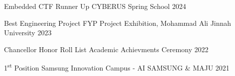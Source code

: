 \begin{cvhonors} 


  \cvhonor
    {Embedded CTF Runner Up} %
    {CYBERUS Spring School} %
    {\hspace{-2em}} %
    {2024} %
    
    
  \cvhonor
    {Best Engineering Project} %
    {FYP Project Exhibition, Mohammad Ali Jinnah University} %
    {\hspace{-2em}} %
    {2023} %

  \cvhonor
    {Chancellor Honor Roll List} %
    {Academic Achievments Ceremony} %
    {\hspace{-2em}} %
    {2022} %

  \cvhonor
    {1\textsuperscript{st} Position Samsung Innovation Campus - AI} %
    {SAMSUNG \& MAJU} %
    {\hspace{-2em} } %
    {2021} %




\end{cvhonors}


